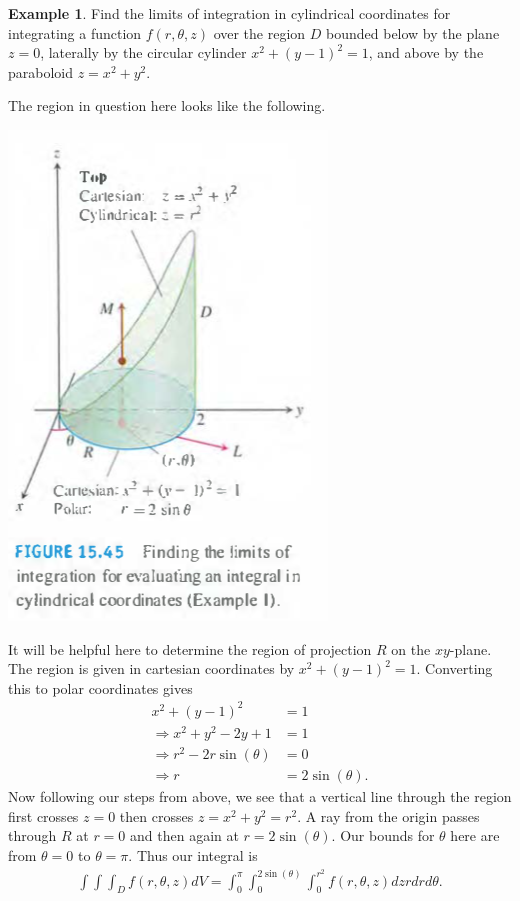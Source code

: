 \documentclass[12pt, letter]{article}
\theoremstyle{plain}
\numberwithin{theorem}{section}
\theoremstyle{definition}
\newtheorem{example}[theorem]{Example}
\begin{document}
\begin{example}
Find the limits of integration in cylindrical coordinates for integrating a function $f(r,\theta,z)$ over the region $D$ bounded below by the plane $z=0$, laterally by the circular cylinder $x^2+(y-1)^2 = 1$, and above by the paraboloid $z=x^2+y^2$.

\bigskip

The region in question here looks like the following.

\bigskip

\begin{center}
\includegraphics[scale=0.7]{m3_f20}
\end{center}

\bigskip

It will be helpful here to determine the region of projection $R$ on the $xy$-plane. The region is given in cartesian coordinates by $x^2+(y-1)^2=1$. Converting this to polar coordinates gives
\begin{align*}
x^2+(y-1)^2&=1\\
\Rightarrow x^2+y^2-2y+1&=1\\
\Rightarrow r^2-2r\sin(\theta)&=0\\
\Rightarrow r&=2\sin(\theta).
\end{align*}
Now following our steps from above, we see that a vertical line through the region first crosses $z=0$ then crosses $z=x^2+y^2=r^2$. A ray from the origin passes through $R$ at $r=0$ and then again at $r=2\sin(\theta)$. Our bounds for $\theta$ here are from $\theta=0$ to $\theta=\pi$. Thus our integral is
\begin{align*}
\int \int \int_D f(r,\theta,z)dV = \int_0^\pi \int_0^{2\sin(\theta)} \int_0^{r^2} f(r,\theta,z) dz r dr d\theta.
\end{align*}
\end{example}
\end{document}
